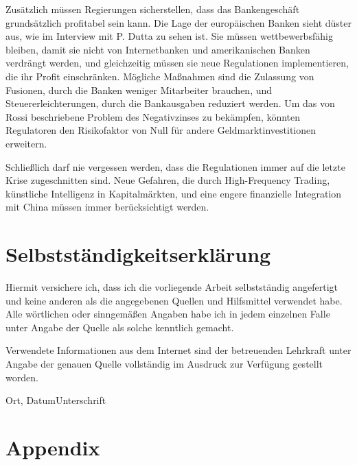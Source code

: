 \documentclass[a4paper,11pt]{report}
\begin{document}
Zus\"atzlich m\"ussen Regierungen 
sicherstellen, dass das Bankengesch\"aft
grunds\"atzlich profitabel sein kann.
Die Lage der europäischen Banken sieht d\"uster aus, wie
im Interview mit P. Dutta zu sehen ist.
Sie m\"ussen wettbewerbsf\"ahig bleiben, damit
sie nicht von Internetbanken und amerikanischen Banken verdr\"angt werden,
und gleichzeitig m\"ussen sie neue Regulationen implementieren,
die ihr Profit einschr\"anken.
M\"ogliche Maßnahmen sind die Zulassung von Fusionen,
durch die Banken weniger Mitarbeiter brauchen, und Steuererleichterungen,
durch die Bankausgaben reduziert werden.
Um das von Rossi beschriebene Problem des Negativzinses zu bek\"ampfen,
k\"onnten Regulatoren den Risikofaktor von Null f\"ur andere 
Geldmarktinvestitionen erweitern. 

Schließlich darf nie vergessen werden, dass die Regulationen
immer auf die letzte Krise zugeschnitten sind. Neue Gefahren, die
durch High-Frequency Trading, k\"unstliche Intelligenz in Kapitalm\"arkten,
und eine engere finanzielle Integration mit China m\"ussen immer ber\"ucksichtigt werden.

\newpage
\printbibliography[
  heading=bibintoc,
  title={Literaturverzeichnis}
  ]

\newpage

\chapter{Selbstst\"andigkeitserkl\"arung}
Hiermit versichere ich, dass ich die vorliegende Arbeit selbstst\"andig angefertigt
und keine anderen als die angegebenen Quellen und Hilfsmittel verwendet habe.
Alle w\"ortlichen oder sinngem\"aßen Angaben habe ich in jedem einzelnen Falle unter
Angabe der Quelle als solche kenntlich gemacht.

Verwendete Informationen aus dem Internet sind der betreuenden Lehrkraft unter
Angabe der genauen Quelle vollst\"andig im Ausdruck zur Verf\"ugung gestellt worden.

\bigskip\bigskip\bigskip\bigskip

\hrulefill

Ort, Datum\hfill Unterschrift

\chapter{Appendix}
\end{document}
